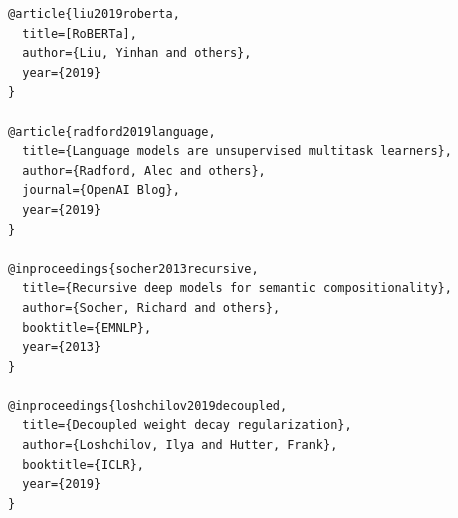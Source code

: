 \begin{lstlisting}
@article{liu2019roberta,
  title=[RoBERTa],
  author={Liu, Yinhan and others},
  year={2019}
}

@article{radford2019language,
  title={Language models are unsupervised multitask learners},
  author={Radford, Alec and others},
  journal={OpenAI Blog},
  year={2019}
}

@inproceedings{socher2013recursive,
  title={Recursive deep models for semantic compositionality},
  author={Socher, Richard and others},
  booktitle={EMNLP},
  year={2013}
}

@inproceedings{loshchilov2019decoupled,
  title={Decoupled weight decay regularization},
  author={Loshchilov, Ilya and Hutter, Frank},
  booktitle={ICLR},
  year={2019}
}
\end{lstlisting}

